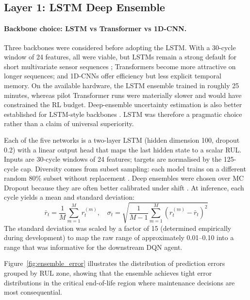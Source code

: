 \documentclass[12pt,a4paper]{report}
\begin{document}
\subsection{Layer 1: LSTM Deep Ensemble}

\paragraph{Backbone choice: LSTM vs Transformer vs 1D-CNN.}
Three backbones were considered before adopting the LSTM. With a 30-cycle window of 24 features, all were viable, but LSTMs remain a strong default for short multivariate sensor sequences \citep{hochreiter1997long, zheng2017long}; Transformers \citep{vaswani2017attention, zhang2022transformer} become more attractive on longer sequences; and 1D-CNNs \citep{li2018remaining} offer efficiency but less explicit temporal memory. On the available hardware, the LSTM ensemble trained in roughly 25 minutes, whereas pilot Transformer runs were materially slower and would have constrained the RL budget. Deep-ensemble uncertainty estimation is also better established for LSTM-style backbones \citep{lakshminarayanan2017simple, fort2019deep}. LSTM was therefore a pragmatic choice rather than a claim of universal superiority.

Each of the five networks is a two-layer LSTM (hidden dimension 100, dropout 0.2) with a linear output head that maps the last hidden state to a scalar RUL. Inputs are 30-cycle windows of 24 features; targets are normalised by the 125-cycle cap. Diversity comes from subset sampling: each model trains on a different random 80\% subset without replacement \citep{fort2019deep}. Deep ensembles were chosen over MC Dropout because they are often better calibrated under shift \citep{lakshminarayanan2017simple, ovadia2019can}. At inference, each cycle yields a mean and standard deviation:
\begin{equation}
\bar{r}_t = \frac{1}{M}\sum_{m=1}^{M} r_t^{(m)}, \quad
\sigma_t = \sqrt{\frac{1}{M-1}\sum_{m=1}^{M}\left(r_t^{(m)}-\bar{r}_t\right)^2}
\end{equation}
The standard deviation was scaled by a factor of 15 (determined empirically during development) to map the raw range of approximately 0.01--0.10 into a range that was informative for the downstream DQN agent.


Figure~\ref{fig:ensemble_error} illustrates the distribution of prediction errors grouped by RUL zone, showing that the ensemble achieves tight error distributions in the critical end-of-life region where maintenance decisions are most consequential.
\end{document}
